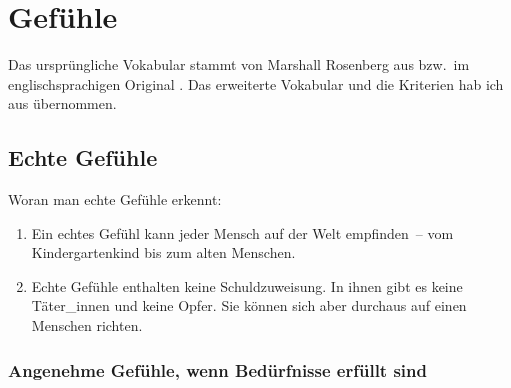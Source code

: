 \section{Gefühle}
\label{gefuehle}

Das ursprüngliche Vokabular stammt von Marshall Rosenberg aus \cite[S.~216]{gfk-rosenberg} bzw.~im englischsprachigen Original \cite[S.~210]{nvc-rosenberg}. Das erweiterte Vokabular und die Kriterien hab ich aus \cite[S.~56~f]{gfk-dummies} übernommen.

\subsection{Echte Gefühle}

Woran man echte Gefühle erkennt:

\begin{enumerate}
    \item Ein echtes Gefühl kann jeder Mensch auf der Welt empfinden~-- vom Kindergartenkind bis zum alten Menschen.
    \item Echte Gefühle enthalten keine Schuldzuweisung. In ihnen gibt es keine Täter\_innen und keine Opfer. Sie können sich aber durchaus auf einen Menschen richten.
\end{enumerate}

\subsubsection{Angenehme Gefühle, wenn Bedürfnisse erfüllt sind}
\label{gefuehle-liste}
\label{angenehme-gefuehle}

